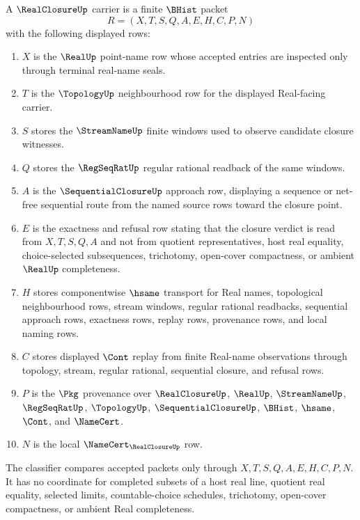 \begin{definition}
\label{def:real-closure-carrier}
A $\RealClosureUp$ carrier is a finite $\BHist$ packet
$$
R=(X,T,S,Q,A,E,H,C,P,N)
$$
with the following displayed rows:
\begin{enumerate}
\item $X$ is the $\RealUp$ point-name row whose accepted entries are inspected only through terminal real-name seals.
\item $T$ is the $\TopologyUp$ neighbourhood row for the displayed Real-facing carrier.
\item $S$ stores the $\StreamNameUp$ finite windows used to observe candidate closure witnesses.
\item $Q$ stores the $\RegSeqRatUp$ regular rational readback of the same windows.
\item $A$ is the $\SequentialClosureUp$ approach row, displaying a sequence or net-free sequential route from the named source rows toward the closure point.
\item $E$ is the exactness and refusal row stating that the closure verdict is read from $X,T,S,Q,A$ and not from quotient representatives, host real equality, choice-selected subsequences, trichotomy, open-cover compactness, or ambient $\RealUp$ completeness.
\item $H$ stores componentwise $\hsame$ transport for Real names, topological neighbourhood rows, stream windows, regular rational readbacks, sequential approach rows, exactness rows, replay rows, provenance rows, and local naming rows.
\item $C$ stores displayed $\Cont$ replay from finite Real-name observations through topology, stream, regular rational, sequential closure, and refusal rows.
\item $P$ is the $\Pkg$ provenance over $\RealClosureUp$, $\RealUp$, $\StreamNameUp$, $\RegSeqRatUp$, $\TopologyUp$, $\SequentialClosureUp$, $\BHist$, $\hsame$, $\Cont$, and $\NameCert$.
\item $N$ is the local $\NameCert_{\RealClosureUp}$ row.
\end{enumerate}
The classifier compares accepted packets only through $X,T,S,Q,A,E,H,C,P,N$. It has no coordinate for completed subsets of a host real line, quotient real equality, selected limits, countable-choice schedules, trichotomy, open-cover compactness, or ambient Real completeness.
\end{definition}

